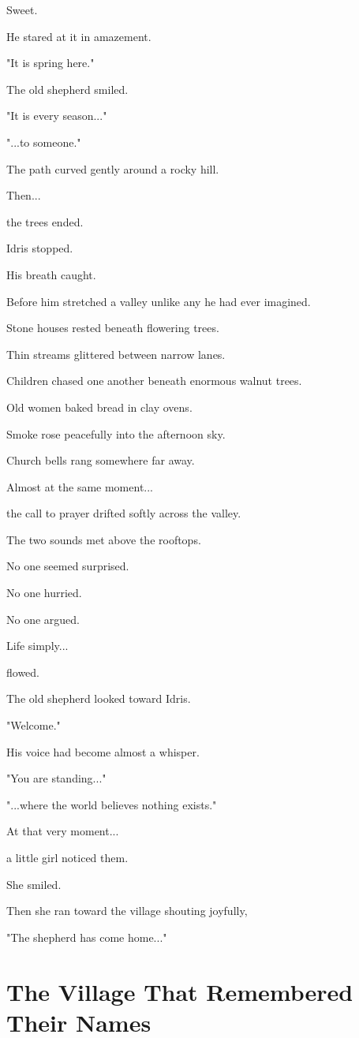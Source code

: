 \documentclass[12pt,openany]{book}
\begin{document}
Sweet.

He stared at it in amazement.

"It is spring here."

The old shepherd smiled.

"It is every season..."

"...to someone."

The path curved gently around a rocky hill.

Then...

the trees ended.

Idris stopped.

His breath caught.

Before him stretched a valley unlike any he had ever imagined.

Stone houses rested beneath flowering trees.

Thin streams glittered between narrow lanes.

Children chased one another beneath enormous walnut trees.

Old women baked bread in clay ovens.

Smoke rose peacefully into the afternoon sky.

Church bells rang somewhere far away.

Almost at the same moment...

the call to prayer drifted softly across the valley.

The two sounds met above the rooftops.

No one seemed surprised.

No one hurried.

No one argued.

Life simply...

flowed.

The old shepherd looked toward Idris.

"Welcome."

His voice had become almost a whisper.

"You are standing..."

"...where the world believes nothing exists."

At that very moment...

a little girl noticed them.

She smiled.

Then she ran toward the village shouting joyfully,

"The shepherd has come home..."
\section*{The Village That Remembered Their Names}
\end{document}
